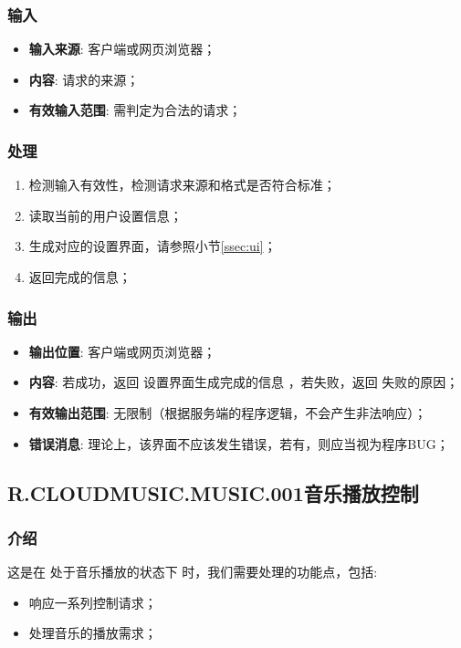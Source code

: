 \subsubsection{输入}
	\begin{itemize}
		\item \textbf{输入来源}: 客户端或网页浏览器；
		\item \textbf{内容}: 请求的来源；
		\item \textbf{有效输入范围}: 需判定为合法的请求；
	\end{itemize}
\subsubsection{处理}
	\begin{enumerate}
		\item 检测输入有效性，检测请求来源和格式是否符合标准；
		\item 读取当前的用户设置信息；
		\item 生成对应的设置界面，请参照小节\ref{ssec:ui}；
		\item 返回完成的信息；
	\end{enumerate}
\subsubsection{输出}
\begin{itemize}
	\item \textbf{输出位置}: 客户端或网页浏览器；
	\item \textbf{内容}: 若成功，返回 设置界面生成完成的信息 ，若失败，返回 失败的原因；
	\item \textbf{有效输出范围}: 无限制（根据服务端的程序逻辑，不会产生非法响应）；
	\item \textbf{错误消息}: 理论上，该界面不应该发生错误，若有，则应当视为程序BUG；
\end{itemize}
\iffalse
\R{
\subsubsection{备注}
该小节，需求编号由原R.CLOUDMUSIC.APP.006更改为R.CLOUDMUSIC.APP.007。
	}
\fi
\subsection{R.CLOUDMUSIC.MUSIC.001音乐播放控制}
\subsubsection{介绍}
	这是在 处于音乐播放的状态下 时，我们需要处理的功能点，包括: 
	\begin{itemize}
		\item 响应一系列控制请求；
		\item 处理音乐的播放需求；
	\end{itemize}
